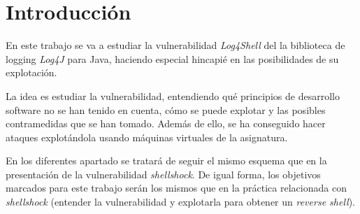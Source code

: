 \documentclass[a4paper,10pt]{article}
\renewcommand{\it}[1]{\textit{#1}}
\begin{document}


\vspace*{2cm}
\section*{\hfil Introducción \hfil}

En este trabajo se va a estudiar la vulnerabilidad \it{Log4Shell}\cite{cve-log4shell} del la biblioteca de logging \it{Log4J} para Java, haciendo especial hincapié en las posibilidades de su explotación.

La idea es estudiar la vulnerabilidad, entendiendo qué principios de desarrollo software no se han tenido en cuenta, cómo se puede explotar y las posibles contramedidas que se han tomado. Además de ello, se ha conseguido hacer ataques explotándola usando máquinas virtuales de la asignatura.

En los diferentes apartado se tratará de seguir el mismo esquema que en la presentación de la vulnerabilidad \it{shellshock}. De igual forma, los objetivos marcados para este trabajo serán los mismos que en la práctica relacionada con \it{shellshock} (entender la vulnerabilidad y explotarla para obtener un \it{reverse shell}).

\pagebreak

\begin{spacing}{0.1}
\tableofcontents
\end{spacing}

\pagebreak

\setcounter{page}{1}

\pagestyle{fancy}



\clearpage{}
\newpage



\clearpage{}
\newpage



\clearpage{}
\newpage



\clearpage{}
\newpage



\clearpage{}
\newpage

\nocite{*}
\printbibliography
\end{document}
